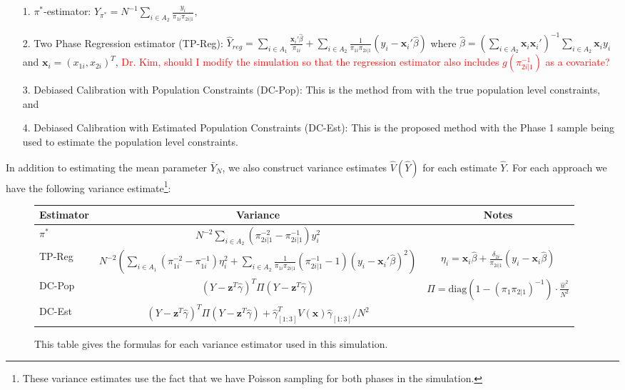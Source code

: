 \documentclass[12pt]{article}
\renewcommand{\bf}[1]{\mathbf{#1}}
\begin{document}
\begin{itemize}
  \item[1.] $\pi^*$-estimator: $\hat Y_{\pi^*} = N^{-1} \sum_{i \in A_2}
    \frac{y_i}{\pi_{1i} \pi_{2i|1}},$
  \item[2.] Two Phase Regression estimator (TP-Reg): 
    $\hat Y_{reg} = \sum_{i \in A_1} \frac{\bf x_i' \hat \beta}{\pi_{1i}} + 
    \sum_{i \in A_2} \frac{1}{\pi_{1i}\pi_{2i|1}}(y_i - \bf x_i' \hat \beta)$ 
    where $\hat \beta = 
    \left(\sum_{i \in A_2} \bf x_i \bf x_i'\right)^{-1} \sum_{i \in A_2} \bf x_i y_i$
    and $\bf x_i = (x_{1i}, x_{2i})^T$,
    \textcolor{red}{Dr. Kim, should I modify the simulation so that the
    regression estimator also includes $g(\pi_{2i|1}^{-1})$ as a covariate?}
  \item[3.] Debiased Calibration with Population Constraints (DC-Pop): This is
    the method from \cite{kwon2024debiased} with the true population level
    constraints, and 
  \item[4.] Debiased Calibration with Estimated Population Constraints (DC-Est):
    This is the proposed method with the Phase 1 sample being used to estimate
    the population level constraints.
\end{itemize}

In addition to estimating the mean parameter $\bar Y_N$, we also construct
variance estimates $\hat V(\hat Y)$ for each estimate $\hat Y$. For each
approach we have the following variance estimate\footnote{These variance
estimates use the fact that we have Poisson sampling for both phases in the
simulation.}:

\begin{figure}[ht!]
  \centering
  \begin{tabular}{lcc}
    \toprule
    Estimator & Variance & Notes \\
    \midrule
    $\pi^*$ & $N^{-2} \sum_{i \in A_2} \left(\pi_{2i|1}^{-2} - \pi_{2i|1}^{-1}\right)
    y_i^2 $ & \\
    TP-Reg  & 
      {\scriptsize $N^{-2}\left(\sum\limits_{i \in A_1} \left(\pi_{1i}^{-2} -
          \pi_{1i}^{-1}\right) 
      \eta_i^2 
      + \sum\limits_{i \in A_2} \frac{1}{\pi_{1i} \pi_{2i|1}}(\pi_{2i|1}^{-1}
  - 1) (y_i - \bf x_i' \hat \beta)^2 \right)$}
    & 
      {\scriptsize$\eta_i = \bf x_i \hat \beta + \frac{\delta_{2i}}{\pi_{2i|1}}(y_i - 
      \bf x_i \hat \beta)$} \\
      DC-Pop  & $(Y - \bf z^T \hat \gamma)^T \Pi (Y - \bf z^T \hat \gamma)$ & 
      {\scriptsize$\Pi
      = \text{diag}(1 - (\pi_{1}\pi_{2|1})^{-1}) \cdot \frac{\hat w^2}{N^2}$} \\
      DC-Est  & $(Y - \bf z^T \hat \gamma)^T \Pi (Y - \bf z^T \hat \gamma) +
      \hat \gamma_{[1:3]}^T V(\bf x) \hat \gamma_{[1:3]}/N^2$ & \\
    \bottomrule
  \end{tabular}
  \caption{This table gives the formulas for each variance estimator used in
  this simulation.}
  \label{tab:varforms}
\end{figure}
\end{document}
